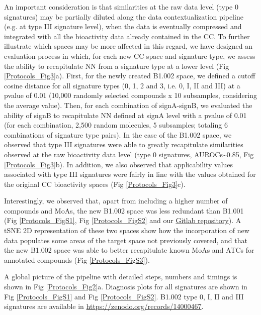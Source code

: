 An important consideration is that similarities at the raw data level (type 0 signatures) may be partially diluted along the data contextualization pipeline (e.g. at type III signature level), when the data is eventually compressed and integrated with all the bioactivity data already contained in the CC. To further illustrate which spaces may be more affected in this regard, we have designed an evaluation process in which, for each new CC space and signature type, we assess the ability to recapitulate NN from a signature type at a lower level (Fig \ref{Protocols_Fig3}a). First, for the newly created B1.002 space, we defined a cutoff cosine distance for all signature types (0, 1, 2 and 3, i.e. 0, I, II and III) at a pvalue of 0.01 (10,000 randomly selected compounds x 10 subsamples, considering the average value). Then, for each combination of signA-signB, we evaluated the ability of signB to recapitulate NN defined at signA level with a pvalue of 0.01 (for each combination, 2,500 random molecules, 5 subsamples; totaling 6 combinations of signature type pairs). In the case of the B1.002 space, we observed that type III signatures were able to greatly recapitulate similarities observed at the raw bioactivity data level (type 0 signatures, AUROCs\textasciitilde0.85, Fig \ref{Protocols_Fig3}b). In addition, we also observed that applicability values associated with type III signatures were fairly in line with the values obtained for the original CC bioactivity spaces (Fig \ref{Protocols_Fig3}c).

Interestingly, we observed that, apart from including a higher number of compounds and MoAs, the new B1.002 space was less redundant than B1.001 (Fig \ref{Protocols_FigS1}, Fig \ref{Protocols_FigS2} and our \href{https://gitlabsbnb.irbbarcelona.org/packages/protocols}{Gitlab repository}). A tSNE 2D representation of these two spaces show how the incorporation of new data populates some areas of the target space not previously covered, and that the new B1.002 space was able to better recapitulate known MoAs and ATCs for annotated compounds (Fig \ref{Protocols_FigS3}). 

A global picture of the pipeline with detailed steps, numbers and timings is shown in Fig \ref{Protocols_Fig2}a. Diagnosis plots for all signatures are shown in Fig \ref{Protocols_FigS1} and Fig \ref{Protocols_FigS2}. B1.002 type 0, I, II and III signatures are available in \hyperlink{https://zenodo.org/records/14000467}{https://zenodo.org/records/14000467}. 

